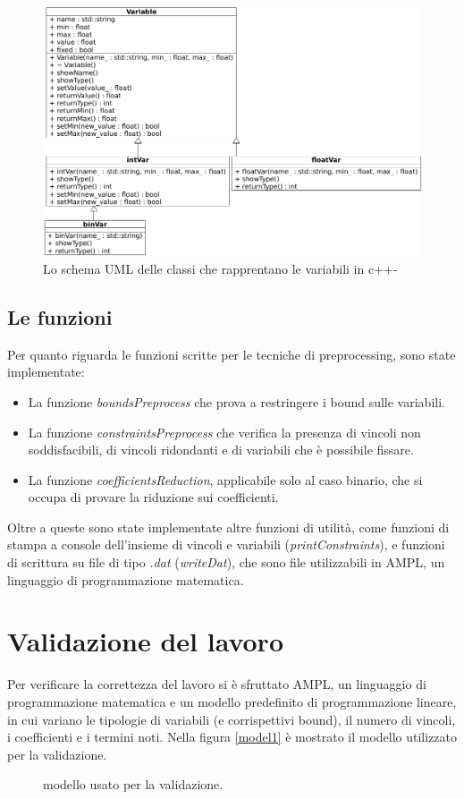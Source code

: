 \documentclass{article}
\newcommand{\perlscript}[2]{
\begin{figure}[ht]
\scalebox{.9}{
}
\caption{\footnotesize{ modello usato per la validazione.}}
\end{figure}
}
\begin{document}
\begin{center}
\begin{figure}
\includegraphics[scale=0.38]{uml.png}
\caption{\footnotesize{Lo schema UML delle classi che rapprentano le variabili in c++-}}
\label{UML}
\end{figure}
\end{center}
\subsection{Le funzioni}
Per quanto riguarda le funzioni scritte per le tecniche di preprocessing, sono state implementate:

\begin{itemize}
\item La funzione \textit{boundsPreprocess} che prova a restringere i bound sulle variabili.
\item La funzione \textit{constraintsPreprocess} che verifica la presenza di vincoli
non soddisfacibili, di vincoli ridondanti e di variabili che è possibile fissare.
\item La funzione \textit{coefficientsReduction}, applicabile solo al caso binario, che si occupa di provare la riduzione sui coefficienti.
\end{itemize}

Oltre a queste sono state implementate altre funzioni di utilità, come funzioni di stampa a console dell'insieme di vincoli e variabili (\textit{printConstraints}), e funzioni di scrittura su file di tipo \textit{.dat} (\textit{writeDat}), che sono file utilizzabili in AMPL, un linguaggio di programmazione matematica.

\section{Validazione del lavoro}
Per verificare la correttezza del lavoro si è sfruttato AMPL, un linguaggio di programmazione matematica e un modello predefinito di programmazione lineare, in cui variano le tipologie di variabili (e corrispettivi bound), il numero di vincoli, i coefficienti e i termini noti. Nella figura \ref{model1} è mostrato il modello utilizzato per la validazione.

\perlscript{model1}{Modello usato per la validazione.}


\end{document}
